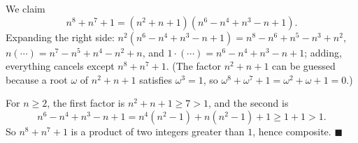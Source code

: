 We claim
\[
n^8+n^7+1=(n^2+n+1)(n^6-n^4+n^3-n+1).
\]
Expanding the right side: $n^2(n^6-n^4+n^3-n+1)=n^8-n^6+n^5-n^3+n^2$, $n(\cdots)=n^7-n^5+n^4-n^2+n$, and $1\cdot(\cdots)=n^6-n^4+n^3-n+1$; adding, everything cancels except $n^8+n^7+1$. (The factor $n^2+n+1$ can be guessed because a root $\omega$ of $n^2+n+1$ satisfies $\omega^3=1$, so $\omega^8+\omega^7+1=\omega^2+\omega+1=0$.)

For $n\ge2$, the first factor is $n^2+n+1\ge7>1$, and the second is
\[
n^6-n^4+n^3-n+1=n^4(n^2-1)+n(n^2-1)+1\ge1+1>1 .
\]
So $n^8+n^7+1$ is a product of two integers greater than $1$, hence composite. $\blacksquare$

